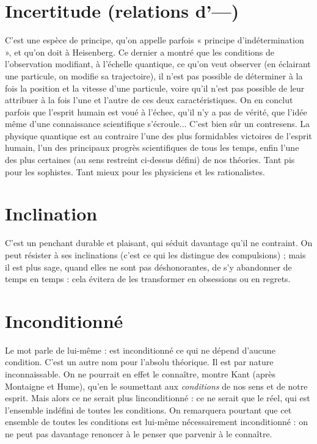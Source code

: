 \section{Incertitude (relations d'—)}
C’est une espèce de principe, qu’on
appelle parfois « principe d’indétermination »,
et qu’on doit à Heisenberg. Ce dernier a montré que les conditions
de l'observation modifiant, à l'échelle quantique, ce qu’on veut observer (en
éclairant une particule, on modifie sa trajectoire), il n’est pas possible de déterminer
à la fois la position et la vitesse d’une particule, voire qu’il n’est pas possible
de leur attribuer à la fois l’une et l’autre de ces deux caractéristiques. On
en conclut parfois que l'esprit humain est voué à l’échec, qu’il n’y a pas de
vérité, que l’idée même d’une connaissance scientifique s’écroule... C’est bien
sûr un contresens. La physique quantique est au contraire l’une des plus formidables
victoires de l'esprit humain, l’un des principaux progrès scientifiques de
tous les temps, enfin l’une des plus certaines (au sens restreint ci-dessus défini)
de nos théories. Tant pis pour les sophistes. Tant mieux pour les physiciens et
les rationalistes.

\section{Inclination}
C’est un penchant durable et plaisant, qui séduit davantage
qu’il ne contraint. On peut résister à ses inclinations (c’est
ce qui les distingue des compulsions) ; mais il est plus sage, quand elles ne sont
pas déshonorantes, de s’y abandonner de temps en temps : cela évitera de les
transformer en obsessions ou en regrets.

\section{Inconditionné}
Le mot parle de lui-même : est inconditionné ce qui ne
dépend d’aucune condition. C’est un autre nom pour
l'absolu théorique. Il est par nature inconnaissable. On ne pourrait en effet le
connaître, montre Kant (après Montaigne et Hume), qu’en le soumettant aux
{\it conditions} de nos sens et de notre esprit. Mais alors ce ne serait plus
linconditionné : ce ne serait que le réel, qui est l’ensemble indéfini de toutes les
conditions. On remarquera pourtant que cet ensemble de toutes les conditions
est lui-même nécessairement inconditionné : on ne peut pas davantage
renoncer à le penser que parvenir à le connaître.

